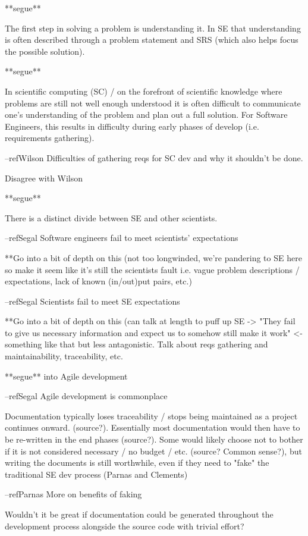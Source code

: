 \documentclass[10pt, preprint]{sigplanconf}
\begin{document}
**segue**

The first step in solving a problem is understanding it. In SE that understanding is often described through a problem statement and SRS (which also helps focus the possible solution).

**segue**

In scientific computing (SC) / on the forefront of scientific knowledge where problems are still not well enough understood it is often difficult to communicate one's understanding of the problem and plan out a full solution. For Software Engineers, this results in difficulty during early phases of develop (i.e. requirements gathering).

--refWilson Difficulties of gathering reqs for SC dev and why it shouldn't be done.

Disagree with Wilson

**segue**

There is a distinct divide between SE and other scientists.

--refSegal Software engineers fail to meet scientists' expectations

    **Go into a bit of depth on this (not too longwinded, we're pandering to SE here so make it seem like it's still the scientists fault i.e. vague problem descriptions / expectations, lack of known (in/out)put pairs, etc.)

--refSegal Scientists fail to meet SE expectations

    **Go into a bit of depth on this (can talk at length to puff up SE -> "They fail to give us necessary information and expect us to somehow still make it work" <- something like that but less antagonistic. Talk about reqs gathering and maintainability, traceability, etc.

**segue** into Agile development

--refSegal Agile development is commonplace

Documentation typically loses traceability / stops being maintained as a project continues onward. (source?). Essentially most documentation would then have to be re-written in the end phases (source?). Some would likely choose not to bother if it is not considered necessary / no budget / etc. (source? Common sense?), but writing the documents is still worthwhile, even if they need to "fake" the traditional SE dev process (Parnas and Clements)

--refParnas More on benefits of faking

Wouldn't it be great if documentation could be generated throughout the development process alongside the source code with trivial effort?
\end{document}
